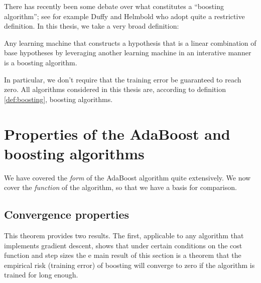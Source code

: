 There has recently been some debate over what constitutes a ``boosting
algorithm''; see for example Duffy and Helmbold \cite{Duffy99} who
adopt quite a restrictive definition.  In this thesis, we take a very
broad definition:

\begin{definition}
Any learning machine that constructs a hypothesis that is a linear
combination of base hypotheses by leveraging another learning machine
in an interative manner is a boosting algorithm.
\end{definition}

In particular, we don't require that the training error be guaranteed
to reach zero.  All algorithms considered in this thesis are,
according to definition \ref{def:boosting}, boosting algorithms.


\section{Properties of the AdaBoost and boosting algorithms}

We have covered the \emph{form} of the AdaBoost algorithm quite
extensively.  We now cover the \emph{function} of the algorithm, so
that we have a basis for comparison.

\subsection{Convergence properties}

This theorem provides two results.  The first, applicable to any
algorithm that implements gradient descent, shows that under certain
conditions on the cost function and step sizes the 
e main result of this section is a theorem that the empirical risk
(training error) of boosting will converge to zero if the algorithm is
trained for long enough.

